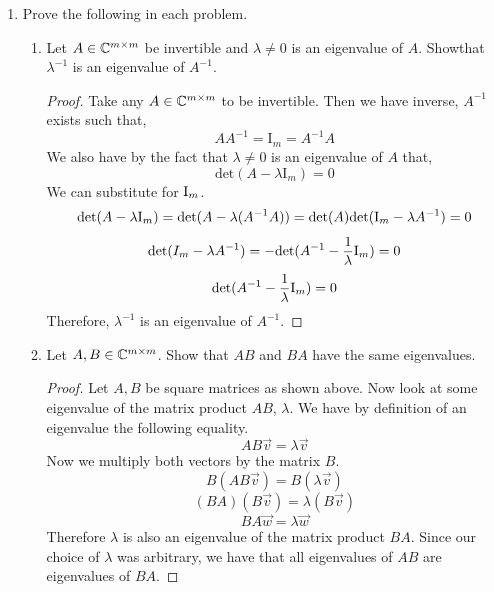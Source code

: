 \documentclass{article}
\begin{document}
\begin{enumerate}
\begin{proof}
We then define the matrix $C = A^*$, $C^* = A$. Notice that C is an upper triangular, unitary matrix. By the previous proof, $C$ is a diagonal matrix. Notice all of its ``off-diagonal'' elements are zero. As a consequnce, all (i, j)-elements of $C$ which are zero imply that (j, i)-elements of $C^*$ are zero. Therefore, $C^* = A$ is a diagonal matrix.


\end{proof}%

\item %
Prove the following in each problem.
\begin{enumerate}

    \item
    Let $A \in \mathbb{C}^{m \times m}$ be invertible and $\lambda \neq 0$ is an eigenvalue of $A$. Showthat $\lambda^{-1}$ is an eigenvalue of $A^{-1}$.

    \begin{proof}

    Take any $A \in \mathbb{C}^{m\times m}$ to be invertible. Then we have inverse, $A^{-1}$ exists such that, 
    \[
        AA^{-1} = \mathrm{I}_m = A^{-1}A
    \]
    We also have by the fact that $\lambda \neq 0$ is an eigenvalue of $A$ that, 
    \[
        \text{det}(A - \lambda\mathrm{I}_m) = 0
    \]
    We can substitute for $\mathrm{I}_m$.
    \[
        \text{det}(A - \lambda\mathrm{I}_m) = \text{det}(A - \lambda(A^{-1}A)) =     \text{det}(A)\text{det}(\mathrm{I}_m - \lambda A^{-1}) = 0 
    \]
    \[
        \text{det}(I_m - \lambda A^{-1}) = -\text{det}(A^{-1} - \frac{1}{\lambda}\mathrm{I}_m) = 0
    \]
    \[
        \text{det}(A^{-1} - \frac{1}{\lambda}\mathrm{I}_m) = 0
    \]
    Therefore, $\lambda^{-1}$ is an eigenvalue of $A^{-1}$.
    
    \end{proof}


    \item 
    Let $A, B \in \mathbb{C}^{m\times m}$. Show that $AB$ and $BA$ have the same eigenvalues.
    
    \begin{proof}
    
    Let $A, B$ be square matrices as shown above. Now look at some eigenvalue of the   matrix product $AB$, $\lambda$. We have by definition of an eigenvalue the following equality.
    \[
        AB\vec{v} = \lambda\vec{v}
    \]
    Now we multiply both vectors by the matrix $B$.
    \[
        B(AB\vec{v}) = B(\lambda\vec{v})
    \]
    \[
       (BA)(B\vec{v}) = \lambda(B\vec{v})  
    \]
    \[
        BA\vec{w} = \lambda\vec{w}
    \]
    Therefore $\lambda$ is also an eigenvalue of the matrix product $BA$. Since our choice of $\lambda$ was arbitrary, we have that all eigenvalues of $AB$ are eigenvalues of $BA$. 
    \end{proof}



\end{enumerate}
\end{enumerate}
\end{document}

